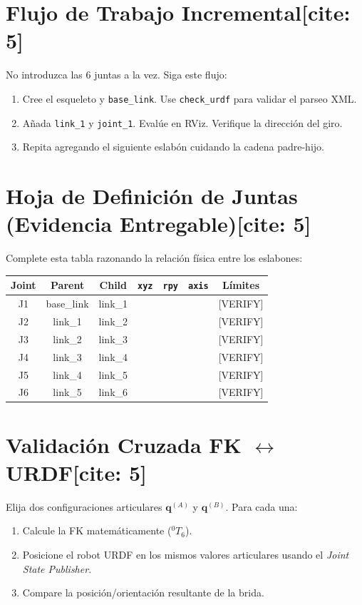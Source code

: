 \documentclass[11pt, a4paper]{article}
\begin{document}
\section{Flujo de Trabajo Incremental[cite: 5]}
No introduzca las 6 juntas a la vez. Siga este flujo:
\begin{enumerate}
    \item Cree el esqueleto y \texttt{base\_link}. Use \texttt{check\_urdf} para validar el parseo XML.
    \item Añada \texttt{link\_1} y \texttt{joint\_1}. Evalúe en RViz. Verifique la dirección del giro.
    \item Repita agregando el siguiente eslabón cuidando la cadena padre-hijo.
\end{enumerate}

\section{Hoja de Definición de Juntas (Evidencia Entregable)[cite: 5]}
Complete esta tabla razonando la relación física entre los eslabones:

\begin{center}
    \small %
    \renewcommand{\arraystretch}{1.5}
    \begin{tabularx}{\textwidth}{|c|c|c|X|X|c|c|}
    \hline
    \textbf{Joint} & \textbf{Parent} & \textbf{Child} & \textbf{\texttt{xyz}} & \textbf{\texttt{rpy}} & \textbf{\texttt{axis}} & \textbf{Límites} \\ \hline
    J1 & base\_link & link\_1 & & & & [VERIFY] \\ \hline
    J2 & link\_1 & link\_2 & & & & [VERIFY] \\ \hline
    J3 & link\_2 & link\_3 & & & & [VERIFY] \\ \hline
    J4 & link\_3 & link\_4 & & & & [VERIFY] \\ \hline
    J5 & link\_4 & link\_5 & & & & [VERIFY] \\ \hline
    J6 & link\_5 & link\_6 & & & & [VERIFY] \\ \hline
    \end{tabularx}
\end{center}

\section{Validación Cruzada FK $\leftrightarrow$ URDF[cite: 5]}
Elija dos configuraciones articulares $\mathbf{q}^{(A)}$ y $\mathbf{q}^{(B)}$. Para cada una:
\begin{enumerate}
    \item Calcule la FK matemáticamente (${}^0T_6$).
    \item Posicione el robot URDF en los mismos valores articulares usando el \textit{Joint State Publisher}.
    \item Compare la posición/orientación resultante de la brida.
\end{enumerate}
\end{document}
